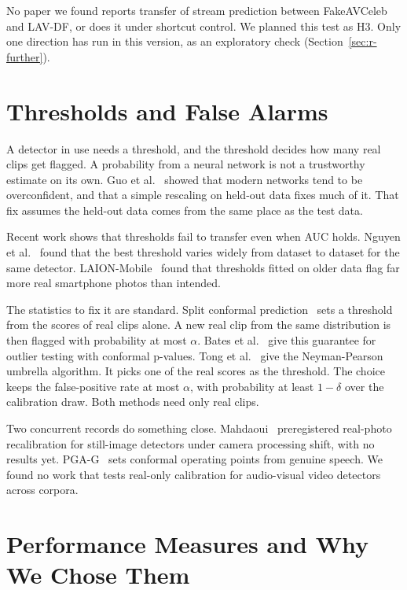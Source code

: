 No paper we found reports transfer of stream prediction between FakeAVCeleb
and LAV-DF, or does it under shortcut control. We planned this test as H3.
Only one direction has run in this version, as an exploratory check
(Section~\ref{sec:r-further}).

\section{Thresholds and False Alarms}
\label{sec:l-thresholds}

A detector in use needs a threshold, and the threshold decides how many real
clips get flagged. A probability from a neural network is not a trustworthy
estimate on its own. Guo et al.~\cite{guo2017} showed that modern networks
tend to be overconfident, and that a simple rescaling on held-out data fixes
much of it. That fix assumes the held-out data comes from the same place as
the test data.

Recent work shows that thresholds fail to transfer even when AUC holds.
Nguyen et al.~\cite{nguyen2026} found that the best threshold varies widely
from dataset to dataset for the same detector. LAION-Mobile~\cite{laionmobile2026}
found that thresholds fitted on older data flag far more real smartphone
photos than intended.

The statistics to fix it are standard. Split conformal prediction~\cite{conformalintro}
sets a threshold from the scores of real clips alone. A new real clip from the
same distribution is then flagged with probability at most $\alpha$. Bates et
al.~\cite{bates2023} give this guarantee for outlier testing with conformal
p-values. Tong et al.~\cite{tong2018} give the Neyman-Pearson umbrella
algorithm. It picks one of the real scores as the threshold. The choice keeps
the false-positive rate at most $\alpha$, with probability at least
$1-\delta$ over the calibration draw. Both methods need only real clips.

Two concurrent records do something close. Mahdaoui~\cite{mahdaoui2026}
preregistered real-photo recalibration for still-image detectors under camera
processing shift, with no results yet. PGA-G~\cite{pgag2026} sets conformal
operating points from genuine speech. We found no work that tests real-only
calibration for audio-visual video detectors across corpora.

\section{Performance Measures and Why We Chose Them}
\label{sec:l-measures}

